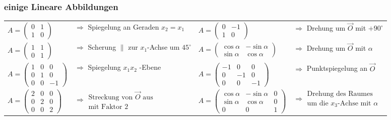 	\subsubsection{einige Lineare Abbildungen}
		\begin{tabular}{llll}
			$A=	\left(\begin{array}{ll}0 &1 \\1 &0\end{array}\right)$ 
        			&$\Rightarrow$ Spiegelung an Geraden $x_2=x_1$
			&$A=	\left(\begin{array}{ll}0 &-1 \\1 &0\end{array}\right)$ 
            		&$\Rightarrow$ Drehung um $\vec{O}$ mit $+90^{\circ}$\\
			$A=	\left(\begin{array}{ll}1 &1 \\0 &1\end{array}\right)$ 
            		&$\Rightarrow$ Scherung $\|$ zur $x_1$-Achse um $45^{\circ}$
			&$A=	\left(\begin{array}{ll}\cos{\alpha} &-\sin{\alpha} \\\sin{\alpha} &\cos{\alpha}\end{array}\right)$ 
            		&$\Rightarrow$ Drehung um $\vec{O}$ mit $\alpha$\\			
			$A=	\left(\begin{array}{llc}1 &0 &0 \\0 &1 &0 \\0 &0 &-1\end{array}\right)$ 
            		&$\Rightarrow$ Spiegelung  $x_1x_2$ -Ebene
			&$A=	\left(\begin{array}{lll}-1 &0 &0 \\0 &-1 &0 \\0 &0 &-1\end{array}\right)$ 
            		&$\Rightarrow$ Punktspiegelung an $\vec{O}$\\	
			$A=	\left(\begin{array}{lll}2 &0 &0 \\0 &2 &0 \\0 &0 &2\end{array}\right) $
			&$\Rightarrow\begin{array}{l}\mbox{Streckung von } \vec{O} \mbox{ aus} \\ \mbox{mit Faktor 2} \end{array}$
			&$A=	\left(\begin{array}{lll}\cos{\alpha} &-\sin{\alpha} &0 \\ \sin{\alpha}
			&\cos{\alpha} &0 \\0 &0 &1\end{array}\right)$ 
			&$\Rightarrow \begin{array}{l}\mbox{Drehung des Raumes}\\ \mbox{um die } x_3
			\mbox{-Achse mit } \alpha \end{array}$										
		\end{tabular}

